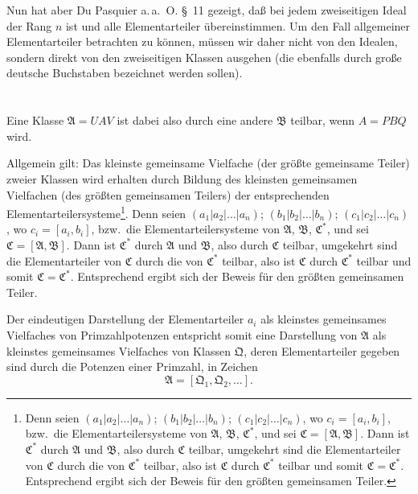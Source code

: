 \documentclass[fontsize=10pt,paper=a5,pagesize,headings=small]{scrbook}
\newcommand{\ideal}[1]{\mathfrak{#1}}
\theoremstyle{plain}
\begin{document}
Nun hat aber Du Pasquier a.\,a.~O. \S~11 gezeigt, daß bei jedem zweiseitigen
Ideal der Rang $n$ ist und alle Elementarteiler übereinstimmen. Um den
Fall allgemeiner Elementarteiler betrachten zu können, müssen wir daher
nicht von den Idealen, sondern direkt von den zweiseitigen Klassen
ausgehen (die ebenfalls durch große deutsche Buchstaben bezeichnet werden
sollen).

\setcounter{page}{409}
\section*{}

Eine Klasse $\ideal{A} = UAV$ ist dabei also durch eine andere $\ideal{B}$
teilbar, wenn $A = PBQ$ wird.

Allgemein gilt: Das kleinste gemeinsame Vielfache (der größte gemeinsame
Teiler) zweier Klassen wird erhalten durch Bildung des kleinsten gemeinsamen
Vielfachen (des größten gemeinsamen Teilers) der entsprechenden
Elementarteilersysteme\footnote{Denn seien $(a_1|a_2|\dots|a_n)$;
$(b_1|b_2|\dots|b_n)$; $(c_1|c_2|\dots|c_n)$, wo $c_i = [a_i, b_i]$, bzw.~die
Elementarteilersysteme von $\ideal{A}$, $\ideal{B}$, $\ideal{C}^*$, und sei
$\ideal{C} = [\ideal{A},\ideal{B}]$. Dann ist $\ideal{C}^*$ durch $\ideal{A}$ und $\ideal{B}$,
also durch $\ideal{C}$ teilbar, umgekehrt sind die Elementarteiler von $\ideal{C}$ durch die
von $\ideal{C}^*$ teilbar, also ist $\ideal{C}$ durch $\ideal{C}^*$ teilbar und somit
$\ideal{C} = \ideal{C}^*$. Entsprechend ergibt sich der Beweis für den größten gemeinsamen
Teiler.}. Denn seien $(a_1|a_2|\dots|a_n)$; $(b_1|b_2|\dots|b_n)$;
$(c_1|c_2|\dots|c_n)$, wo $c_i = [a_i,b_i]$, bzw.~die Elementarteilersysteme
von $\ideal{A}$, $\ideal{B}$, $\ideal{C}^*$, und sei $\ideal{C} = [\ideal{A},\ideal{B}]$.
Dann ist $\ideal{C}^*$ durch $\ideal{A}$ und $\ideal{B}$, also durch $\ideal{C}$ teilbar,
umgekehrt sind die Elementarteiler von $\ideal{C}$ durch die von $\ideal{C}^*$ teilbar,
also ist $\ideal{C}$ durch $\ideal{C}^*$ teilbar und somit $\ideal{C} = \ideal{C}^*$.
Entsprechend ergibt sich der Beweis für den größten gemeinsamen Teiler.

Der eindeutigen Darstellung der Elementarteiler $a_i$ als kleinstes gemeinsames
Vielfaches von Primzahlpotenzen entspricht somit eine Darstellung von
$\ideal{A}$ als kleinstes gemeinsames Vielfaches von Klassen $\ideal{Q}$, deren
Elementarteiler gegeben sind durch die Potenzen einer Primzahl, in Zeichen
\[ \ideal{A} = [\ideal{Q}_1, \ideal{Q}_2,\dots]. \]
\end{document}

